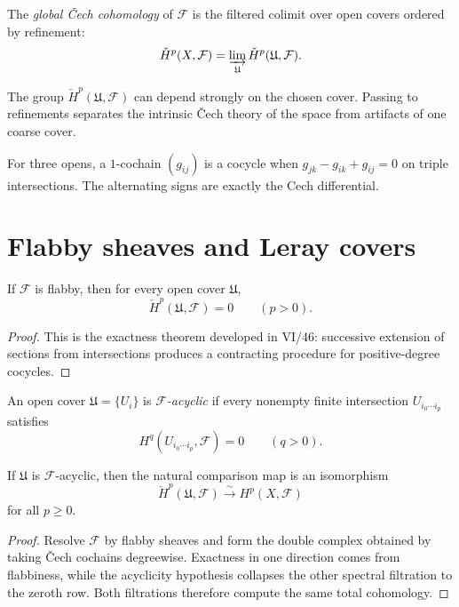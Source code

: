 \begin{definition}\label{def:vi47-global-cech}
The \emph{global \v{C}ech cohomology} of $\mathcal F$ is the filtered colimit over open covers ordered by refinement:
\[
\check H^p(X,\mathcal F)
=
\varinjlim_{\mathfrak U}\check H^p(\mathfrak U,\mathcal F).
\]
\end{definition}

\begin{remark}\label{remark:vi47-cover-dependence}
The group $\check H^p(\mathfrak U,\mathcal F)$ can depend strongly on the chosen cover.  Passing to refinements separates the intrinsic \v{C}ech theory of the space from artifacts of one coarse cover.
\end{remark}

\begin{example}\label{ex:vi47-expand-03}
For three opens, a $1$-cochain $(g_{ij})$ is a cocycle when $g_{jk}-g_{ik}+g_{ij}=0$ on triple intersections.  The alternating signs are exactly the Cech differential.
\end{example}
\section{Flabby sheaves and Leray covers}

\begin{theorem}\label{thm:vi47-flabby-vanish}
If $\mathcal F$ is flabby, then for every open cover $\mathfrak U$,
\[
\check H^p(\mathfrak U,\mathcal F)=0
\qquad(p>0).
\]
\begin{proof}
This is the exactness theorem developed in VI/46: successive extension of sections from intersections produces a contracting procedure for positive-degree cocycles.
\end{proof}
\end{theorem}

\begin{definition}\label{def:vi47-leray-cover}
An open cover $\mathfrak U=\{U_i\}$ is \emph{$\mathcal F$-acyclic} if every nonempty finite intersection $U_{i_0\cdots i_p}$ satisfies
\[
H^q(U_{i_0\cdots i_p},\mathcal F)=0
\qquad(q>0).
\]
\end{definition}

\begin{theorem}\label{thm:vi47-leray}
If $\mathfrak U$ is $\mathcal F$-acyclic, then the natural comparison map is an isomorphism
\[
\check H^p(\mathfrak U,\mathcal F)\xrightarrow{\sim}H^p(X,\mathcal F)
\]
for all $p\ge0$.
\begin{proof}
Resolve $\mathcal F$ by flabby sheaves and form the double complex obtained by taking \v{C}ech cochains degreewise.  Exactness in one direction comes from flabbiness, while the acyclicity hypothesis collapses the other spectral filtration to the zeroth row.  Both filtrations therefore compute the same total cohomology.
\end{proof}
\end{theorem}

